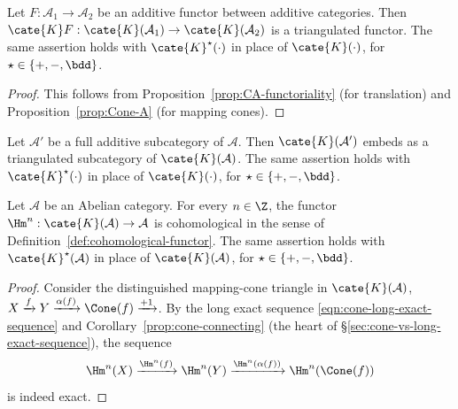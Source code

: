 \begin{proposition}\label{prop:functor-induces-triangulated}
	Let $F: \mathcal{A}_1 \to \mathcal{A}_2$ be an additive functor between
	additive categories. Then
	$\cate{K}F: \cate{K}(\mathcal{A}_1) \to \cate{K}(\mathcal{A}_2)$ is a
	triangulated functor. The same assertion holds with
	$\cate{K}^\star(\cdot)$ in place of $\cate{K}(\cdot)$, for
	$\star \in \{+, -, \bdd\}$.
\end{proposition}

\begin{proof}
	This follows from Proposition~\ref{prop:CA-functoriality} (for
	translation) and Proposition~\ref{prop:Cone-A} (for mapping cones).
\end{proof}

\begin{corollary}\label{prop:subcat-K-triangulated}
	Let $\mathcal{A}'$ be a full additive subcategory of $\mathcal{A}$. Then
	$\cate{K}(\mathcal{A}')$ embeds as a triangulated subcategory of
	$\cate{K}(\mathcal{A})$. The same assertion holds with
	$\cate{K}^\star(\cdot)$ in place of $\cate{K}(\cdot)$, for
	$\star \in \{+, -, \bdd\}$.
\end{corollary}

\begin{proposition}
	Let $\mathcal{A}$ be an Abelian category. For every $n \in \Z$, the
	functor $\Hm^n: \cate{K}(\mathcal{A}) \to \mathcal{A}$ is
	cohomological in the sense of
	Definition~\ref{def:cohomological-functor}. The same assertion holds with
	$\cate{K}^\star(\mathcal{A})$ in place of $\cate{K}(\mathcal{A})$, for
	$\star \in \{+, -, \bdd\}$.
\end{proposition}

\begin{proof}
	Consider the distinguished mapping-cone triangle in
	$\cate{K}(\mathcal{A})$,
	$X \xrightarrow{f} Y \xrightarrow{\alpha(f)} \Cone(f)
	\xrightarrow{+1}$. By the long exact sequence
	\eqref{eqn:cone-long-exact-sequence} and
	Corollary~\ref{prop:cone-connecting} (the heart of
	\S\ref{sec:cone-vs-long-exact-sequence}), the sequence
	\[ \Hm^n(X) \xrightarrow{\Hm^n(f)} \Hm^n(Y) \xrightarrow{\Hm^n(\alpha(f))} \Hm^n(\Cone(f)) \]
	is indeed exact.
\end{proof}


